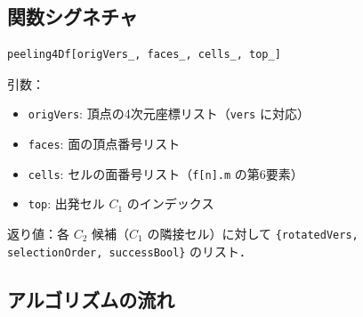 \documentclass[12pt,a4paper]{article}
\theoremstyle{definition}
\begin{document}
\subsection{関数シグネチャ}

\begin{lstlisting}
peeling4Df[origVers_, faces_, cells_, top_]
\end{lstlisting}

\noindent 引数：
\begin{itemize}
  \item \texttt{origVers}: 頂点の4次元座標リスト（\texttt{vers} に対応）
  \item \texttt{faces}: 面の頂点番号リスト
  \item \texttt{cells}: セルの面番号リスト（\texttt{f[n].m} の第6要素）
  \item \texttt{top}: 出発セル $C_1$ のインデックス
\end{itemize}

返り値：各 $C_2$ 候補（$C_1$ の隣接セル）に対して
\texttt{\{rotatedVers, selectionOrder, successBool\}} のリスト．

\subsection{アルゴリズムの流れ}
\end{document}
